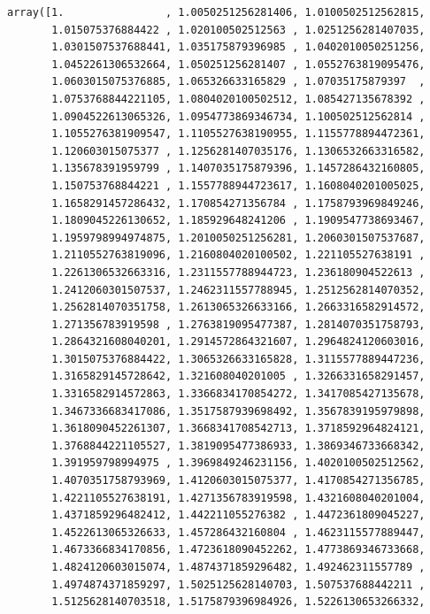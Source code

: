 \documentclass[11pt]{article}
\makeatletter
\newcommand{\boxspacing}{\kern\kvtcb@left@rule\kern\kvtcb@boxsep}
\newcommand{\prompt}[4]{
        {\ttfamily\llap{{\color{#2}[#3]:\hspace{3pt}#4}}\vspace{-\baselineskip}}
    }
\makeatother
\begin{document}
            \begin{tcolorbox}[breakable, size=fbox, boxrule=.5pt, pad at break*=1mm, opacityfill=0]
\prompt{Out}{outcolor}{88}{\boxspacing}
\begin{Verbatim}[commandchars=\\\{\}]
array([1.                , 1.0050251256281406, 1.0100502512562815,
       1.015075376884422 , 1.020100502512563 , 1.0251256281407035,
       1.0301507537688441, 1.035175879396985 , 1.0402010050251256,
       1.0452261306532664, 1.050251256281407 , 1.0552763819095476,
       1.0603015075376885, 1.065326633165829 , 1.07035175879397  ,
       1.0753768844221105, 1.0804020100502512, 1.085427135678392 ,
       1.0904522613065326, 1.0954773869346734, 1.100502512562814 ,
       1.1055276381909547, 1.1105527638190955, 1.1155778894472361,
       1.120603015075377 , 1.1256281407035176, 1.1306532663316582,
       1.135678391959799 , 1.1407035175879396, 1.1457286432160805,
       1.150753768844221 , 1.1557788944723617, 1.1608040201005025,
       1.1658291457286432, 1.170854271356784 , 1.1758793969849246,
       1.1809045226130652, 1.185929648241206 , 1.1909547738693467,
       1.1959798994974875, 1.2010050251256281, 1.2060301507537687,
       1.2110552763819096, 1.2160804020100502, 1.221105527638191 ,
       1.2261306532663316, 1.2311557788944723, 1.236180904522613 ,
       1.2412060301507537, 1.2462311557788945, 1.2512562814070352,
       1.2562814070351758, 1.2613065326633166, 1.2663316582914572,
       1.271356783919598 , 1.2763819095477387, 1.2814070351758793,
       1.2864321608040201, 1.2914572864321607, 1.2964824120603016,
       1.3015075376884422, 1.3065326633165828, 1.3115577889447236,
       1.3165829145728642, 1.321608040201005 , 1.3266331658291457,
       1.3316582914572863, 1.3366834170854272, 1.3417085427135678,
       1.3467336683417086, 1.3517587939698492, 1.3567839195979898,
       1.3618090452261307, 1.3668341708542713, 1.3718592964824121,
       1.3768844221105527, 1.3819095477386933, 1.3869346733668342,
       1.391959798994975 , 1.3969849246231156, 1.4020100502512562,
       1.4070351758793969, 1.4120603015075377, 1.4170854271356785,
       1.4221105527638191, 1.4271356783919598, 1.4321608040201004,
       1.4371859296482412, 1.442211055276382 , 1.4472361809045227,
       1.4522613065326633, 1.457286432160804 , 1.4623115577889447,
       1.4673366834170856, 1.4723618090452262, 1.4773869346733668,
       1.4824120603015074, 1.4874371859296482, 1.492462311557789 ,
       1.4974874371859297, 1.5025125628140703, 1.507537688442211 ,
       1.5125628140703518, 1.5175879396984926, 1.5226130653266332,

\end{Verbatim}
\end{tcolorbox}
\end{document}
